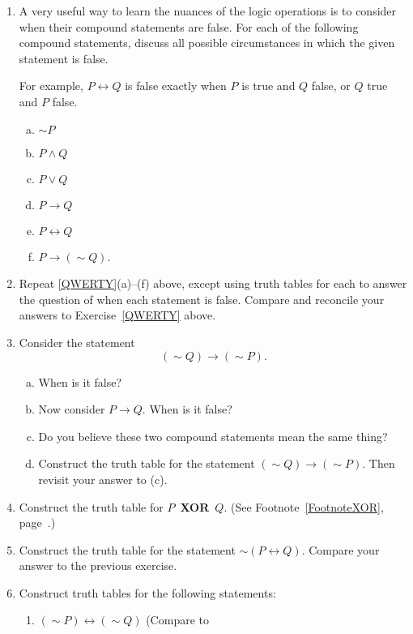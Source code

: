 \begin{multicols}{2}
\begin{enumerate}
\item A very useful way to learn the nuances of the
logic operations is to consider when their
compound statements are false.
For each of the following compound statements, discuss
all possible circumstances in which the given statement is false.

For example, $P\longleftrightarrow Q$ is false exactly when
$P$ is true and $Q$ false, or $Q$ true and $P$ false.
\label{QWERTY}
\begin{enumerate}[(a)]
\item $\sim P$\label{ASDF}
\item $P\wedge Q$
\item $P\vee Q$
\item $P\longrightarrow Q$
\item $P\longleftrightarrow Q$
\item $P\longrightarrow(\sim Q)$.\label{JKL;}
\end{enumerate}
\item Repeat \ref{QWERTY}(a)--(f) above, except
      using truth tables for each to answer
      the question of when each statement is false.
      Compare and reconcile your answers to Exercise~\ref{QWERTY}
      above.
\item Consider the statement 
$$(\sim Q)\longrightarrow (\sim P).$$
\begin{enumerate}[(a)]
\item When is it false?  
\item Now consider $P\longrightarrow Q$.  When
is it false?  
\item Do you believe these two compound statements mean the 
same thing?
\item Construct the truth table for the statement
      $(\sim Q)\longrightarrow(\sim P)$.  Then revisit
      your answer to (c).
\end{enumerate}  
\item Construct the truth table for $P$~{\bf XOR}~$Q$.
      (See Footnote~\ref{FootnoteXOR}, page~\pageref{FootnoteXOR}.)
\item Construct the truth table for the statement
      $\sim(P\longleftrightarrow Q)$.
      Compare your answer to the previous exercise.
\item Construct truth tables for the following statements:
  \begin{enumerate}
  \item $(\sim P)\longleftrightarrow(\sim Q)$ (Compare to

\end{enumerate}
\end{enumerate}
\end{multicols}
